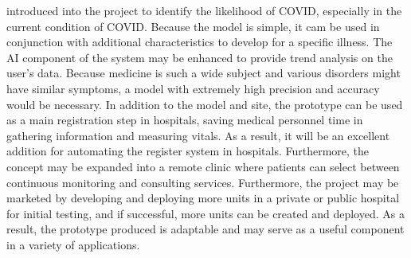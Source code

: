 \documentclass{bmcart}
\begin{document}
introduced into the project to identify the likelihood of COVID, especially in the
current condition of COVID. Because the model is simple, it cam be used in
conjunction with additional characteristics to develop for a specific illness.
The AI component of the system may be enhanced to provide trend analysis on the
user's data. Because medicine is such a wide subject and various disorders might
have similar symptoms, a model with extremely high precision and accuracy would
be necessary. In addition to the model and  site, the prototype can be
used as a main registration step in hospitals, saving medical personnel time
in gathering information and measuring vitals. As a result, it will be an
excellent addition for automating the register system in hospitals. Furthermore,
the concept may be expanded into a remote clinic where patients can select
between continuous monitoring and consulting services. Furthermore, the project
may be marketed by developing and deploying more units in a private or public
hospital for initial testing, and if successful, more units can be created and
deployed. As a result, the prototype produced is adaptable and may serve as a
useful component in a variety of applications.

\end{document}
